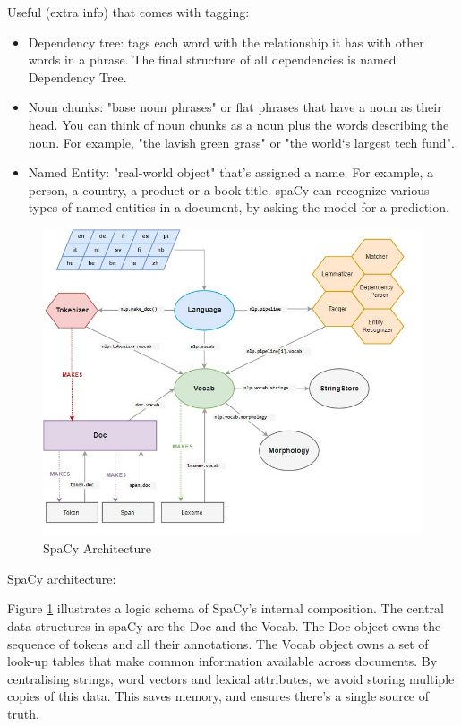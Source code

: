 \documentclass[a4paper,10pt]{article}
\begin{document}
  \newline
  Useful (extra info) that comes with tagging:
  \begin{itemize}
  \item Dependency tree: tags each word with the relationship it has with other words in a phrase. The final structure of all dependencies is named Dependency Tree.
  \item Noun chunks:  "base noun phrases" or flat phrases that have a noun as their head. You can think of noun chunks as a noun plus the words describing the noun. For example, "the lavish green grass" or "the world`s largest tech fund".
  \item Named Entity:  "real-world object" that's assigned a name. For example, a person, a country, a product or a book title. spaCy can recognize various types of named entities in a document, by asking the model for a prediction. 
   \end{itemize}
   
  \begin{figure}
  \centering
  \includegraphics[width=1.2\textwidth]{spacy.jpg}
  \caption{SpaCy Architecture}
  \label{fig:spacy}
 \end{figure}
 
  SpaCy architecture:\newline
 
  Figure \ref{fig:spacy} illustrates a logic schema of SpaCy's internal composition.\newline
  The central data structures in spaCy are the Doc and the Vocab. The Doc object owns the sequence of tokens and all their annotations. The Vocab object owns a set of look-up tables that make common information available across documents. By centralising strings, word vectors and lexical attributes, we avoid storing multiple copies of this data. This saves memory, and ensures there's a single source of truth.\newline
\end{document}

